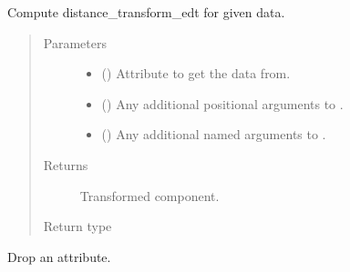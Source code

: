 \documentclass[letterpaper,10pt,english]{sphinxmanual}
\begin{document}
\begin{fulllineitems}
\begin{fulllineitems}
\label{\detokenize{api/rock:geology.src.Rock.distance_transform_edt}}
Compute distance\_transform\_edt for given data.
\begin{quote}\begin{description}
\item[{Parameters}] \leavevmode\begin{itemize}
\item {} 
 (\sphinxstyleliteralemphasis{\sphinxupquote{, }}) \textendash{} Attribute to get the data from.

\item {} 
 () \textendash{} Any additional positional arguments to .

\item {} 
 () \textendash{} Any additional named arguments to .

\end{itemize}

\item[{Returns}] \leavevmode
{} \textendash{} Transformed component.

\item[{Return type}] \leavevmode
{\hyperref[\detokenize{api/base_classes:geology.src.base_spatial.SpatialComponent}]{}}

\end{description}\end{quote}

\end{fulllineitems}


\begin{fulllineitems}
\label{\detokenize{api/rock:geology.src.Rock.drop}}
Drop an attribute.


\end{fulllineitems}
\end{fulllineitems}
\end{document}
